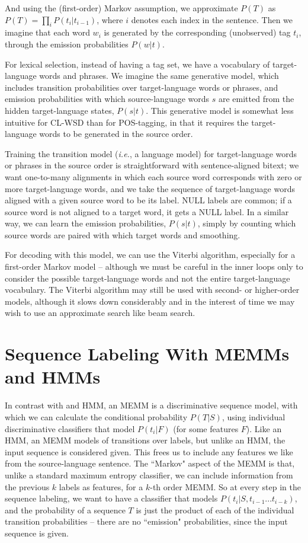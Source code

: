 \documentclass[11pt]{article}
\begin{document}
And using the (first-order) Markov assumption, we approximate $P(T)$ as 
$P(T) = \prod_{i} P(t_i | t_{i-1})$, where $i$ denotes each index in the
sentence. Then we imagine that each word $w_i$ is generated by the
corresponding (unobserved) tag $t_i$, through the emission probabilities
$P(w|t)$.

For lexical selection, instead of having a tag set, we have a vocabulary of
target-language words and phrases. We imagine the same generative model, which
includes transition probabilities over target-language words or phrases, and
emission probabilities with which source-language words $s$ are emitted from
the hidden target-language states, $P(s|t)$. This generative model is somewhat
less intuitive for CL-WSD than for POS-tagging, in that it requires the
target-language words to be generated in the source order.

Training the transition model (\textit{i.e.}, a language model) for
target-language words or phrases in the source order is straightforward with
sentence-aligned bitext; we want one-to-many alignments in which each source
word corresponds with zero or more target-language words, and we take the
sequence of target-language words aligned with a given source word to be its
label. NULL labels are common; if a source word is not aligned to a target
word, it gets a NULL label. In a similar way, we can learn the emission
probabilities, $P(s|t)$, simply by counting which source words are paired with
which target words and smoothing.

For decoding with this model, we can use the Viterbi algorithm, especially for
a first-order Markov model -- although we must be careful in the inner loops
only to consider the possible target-language words and not the entire
target-language vocabulary. The Viterbi algorithm may still be used with
second- or higher-order models, although it slows down considerably and in the
interest of time we may wish to use an approximate search like beam search.

\section{Sequence Labeling With MEMMs and HMMs}
In contrast with and HMM, an MEMM is a discriminative sequence model, with
which we can calculate the conditional probability $P(T|S)$, using individual
discriminative classifiers that model $P(t_i | F)$ (for some features $F$).
Like an HMM, an MEMM models of transitions over labels, but unlike an HMM, the
input sequence is considered given. This frees us to include any features we
like from the source-language sentence. The ``Markov" aspect of the MEMM is
that, unlike a standard maximum entropy classifier, we can include information
from the previous $k$ labels as features, for a $k$-th order MEMM. So at every
step in the sequence labeling, we want to have a classifier that models 
$P(t_i | S, t_{i-1}...t_{i-k})$, and the probability of a sequence $T$ is just
the product of each of the individual transition probabilities -- there are no
``emission" probabilities, since the input sequence is given.
\end{document}
